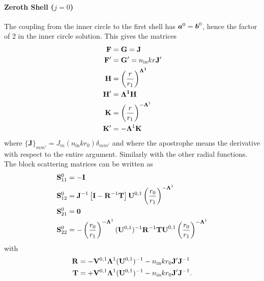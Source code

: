 \paragraph{Zeroth Shell ($j=0$)}
The coupling from the inner circle to the first shell has
$\boldsymbol{a}^0=\boldsymbol{b}^0$, hence the factor of 2 in the inner circle solution.
This gives the matrices
  \begin{align*}
    \mathbf{F}	&= \mathbf{G} = \mathbf{J}			\\
    \mathbf{F}' &= \mathbf{G}'=n_\text{in}kr\mathbf{J}'		\\
    \mathbf{H}	&= \left(\frac{r}{r_1}\right)^{\boldsymbol{\Lambda^1}}	\\
    \mathbf{H}'	&= \boldsymbol{\Lambda^1}\mathbf{H}			\\
    \mathbf{K}	&= \left(\frac{r}{r_1}\right)^{-\boldsymbol{\Lambda}^1}	\\
    \mathbf{K}'	&= -\boldsymbol{\Lambda}^1\mathbf{K}
  \end{align*}
where $\{\mathbf{J}\}_{mm'} = J_m(n_\text{in}kr_0)\delta_{mm'}$ and where the
apostrophe means the derivative with respect to the entire argument. Similarly
with the other radial functions. The block scattering
matrices can be written as
  \begin{subequations}
  \begin{align}
    \mathbf{S}^0_{11}	&= -\mathbf{I}	\\
    \mathbf{S}^0_{12}	&= \mathbf{J}^{-1}\left[\mathbf{I}-\mathbf{R}^{-1}\mathbf{T}\right]\mathbf{U}^{0,1}\left(\frac{r_0}{r_1}\right)^{-\boldsymbol{\Lambda}^1}	\\
    \mathbf{S}^0_{21}	&= \mathbf{0}	\\
    \mathbf{S}^0_{22}	&= -\left(\frac{r_0}{r_1}\right)^{-\boldsymbol{\Lambda}^1}(\mathbf{U}^{0,1})^{-1}\mathbf{R}^{-1}\mathbf{TU}^{0,1}\left(\frac{r_0}{r_1}\right)^{-\boldsymbol{\Lambda}^1}
  \end{align}
  \end{subequations}
with 
  \begin{subequations}
  \begin{align}
   \mathbf{R} &= -\mathbf{V}^{0,1}\boldsymbol{\Lambda}^1(\mathbf{U}^{0,1})^{-1}-n_\text{in}kr_0\mathbf{J}'\mathbf{J}^{-1}	\\
   \mathbf{T} &= +\mathbf{V}^{0,1}\boldsymbol{\Lambda}^1(\mathbf{U}^{0,1})^{-1}-n_\text{in}kr_0\mathbf{J}'\mathbf{J}^{-1}.
  \end{align}
  \end{subequations}

